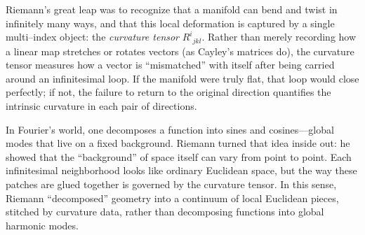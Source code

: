 Riemann’s great leap was to recognize that a manifold can bend and twist in infinitely many ways, and that this local deformation is captured by a single multi–index object: the \emph{curvature tensor} \(R^i{}_{jkl}\).  Rather than merely recording how a linear map stretches or rotates vectors (as Cayley’s matrices do), the curvature tensor measures how a vector is “mismatched” with itself after being carried around an infinitesimal loop.  If the manifold were truly flat, that loop would close perfectly; if not, the failure to return to the original direction quantifies the intrinsic curvature in each pair of directions.

In Fourier’s world, one decomposes a function into sines and cosines—global modes that live on a fixed background.  Riemann turned that idea inside out: he showed that the “background” of space itself can vary from point to point.  Each infinitesimal neighborhood looks like ordinary Euclidean space, but the way these patches are glued together is governed by the curvature tensor.  In this sense, Riemann “decomposed” geometry into a continuum of local Euclidean pieces, stitched by curvature data, rather than decomposing functions into global harmonic modes.

